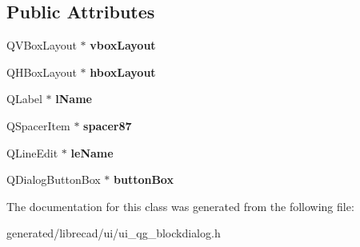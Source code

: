 \subsection*{Public Attributes}
\begin{DoxyCompactItemize}
\item 
\hypertarget{classUi__QG__BlockDialog_a27d997a25616c320b4567215f2445ae7}{Q\-V\-Box\-Layout $\ast$ {\bfseries vbox\-Layout}}\label{classUi__QG__BlockDialog_a27d997a25616c320b4567215f2445ae7}

\item 
\hypertarget{classUi__QG__BlockDialog_a977b4af7b8c76b4809cd547b89261565}{Q\-H\-Box\-Layout $\ast$ {\bfseries hbox\-Layout}}\label{classUi__QG__BlockDialog_a977b4af7b8c76b4809cd547b89261565}

\item 
\hypertarget{classUi__QG__BlockDialog_ab26c8279c6317a3683d58223c76ee25b}{Q\-Label $\ast$ {\bfseries l\-Name}}\label{classUi__QG__BlockDialog_ab26c8279c6317a3683d58223c76ee25b}

\item 
\hypertarget{classUi__QG__BlockDialog_abf1989a09106c519e2391b9ea489005f}{Q\-Spacer\-Item $\ast$ {\bfseries spacer87}}\label{classUi__QG__BlockDialog_abf1989a09106c519e2391b9ea489005f}

\item 
\hypertarget{classUi__QG__BlockDialog_a8927b5e67d22272e1a7ad85ec99b6441}{Q\-Line\-Edit $\ast$ {\bfseries le\-Name}}\label{classUi__QG__BlockDialog_a8927b5e67d22272e1a7ad85ec99b6441}

\item 
\hypertarget{classUi__QG__BlockDialog_a84fb028dcec9fd315ae6be3f1557caf4}{Q\-Dialog\-Button\-Box $\ast$ {\bfseries button\-Box}}\label{classUi__QG__BlockDialog_a84fb028dcec9fd315ae6be3f1557caf4}

\end{DoxyCompactItemize}


The documentation for this class was generated from the following file\-:\begin{DoxyCompactItemize}
\item 
generated/librecad/ui/ui\-\_\-qg\-\_\-blockdialog.\-h\end{DoxyCompactItemize}
